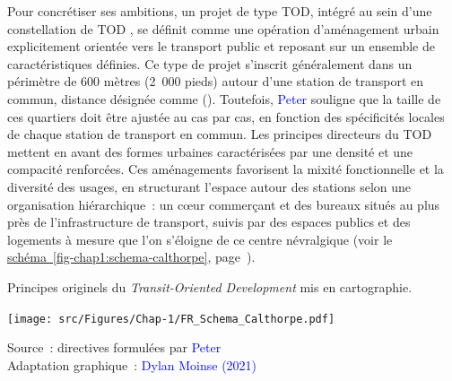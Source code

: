 \begin{refsegment}
Pour concrétiser ses ambitions, un projet de type \acrshort{TOD}, intégré au sein d'une constellation de \acrshort{TOD} \textcolor{blue}{\autocite[42, 56]{calthorpe_next_1993}}, se définit comme une opération d’aménagement urbain explicitement orientée vers le transport public et reposant sur un ensemble de caractéristiques définies. Ce type de projet s’inscrit généralement dans un périmètre de 600 mètres (2~000 pieds) autour d’une station de transport en commun, distance désignée comme  (). Toutefois, \textcolor{blue}{Peter} \textcolor{blue}{\textcite[56]{calthorpe_next_1993}} souligne que la taille de ces quartiers doit être ajustée au cas par cas, en fonction des spécificités locales de chaque station de transport en commun. Les principes directeurs du \acrshort{TOD} mettent en avant des formes urbaines caractérisées par une densité et une compacité renforcées. Ces aménagements favorisent la mixité fonctionnelle et la diversité des usages, en structurant l’espace autour des stations selon une organisation hiérarchique~: un cœur commerçant et des bureaux situés au plus près de l’infrastructure de transport, suivis par des espaces publics et des logements à mesure que l’on s’éloigne de ce centre névralgique (voir le \hyperref[fig-chap1:schema-calthorpe]{schéma~\ref{fig-chap1:schema-calthorpe}}, page~\pageref{fig-chap1:schema-calthorpe}).%

    \begin{carte}[h!]\vspace*{4pt}
        \caption{Principes originels du \textsl{Transit-Oriented Development} mis en cartographie.}
        \label{fig-chap1:schema-calthorpe}
        \centerline{\texttt{[image: src/Figures/Chap-1/FR\_Schema\_Calthorpe.pdf]}}
        \vspace{5pt}
        \begin{flushright}\scriptsize{
        Source~: directives formulées par \textcolor{blue}{Peter} \textcolor{blue}{\textcite{calthorpe_next_1993}}
        \\
        Adaptation graphique~: \textcolor{blue}{Dylan Moinse (2021)}
        }\end{flushright}
    \end{carte}


\end{refsegment}
